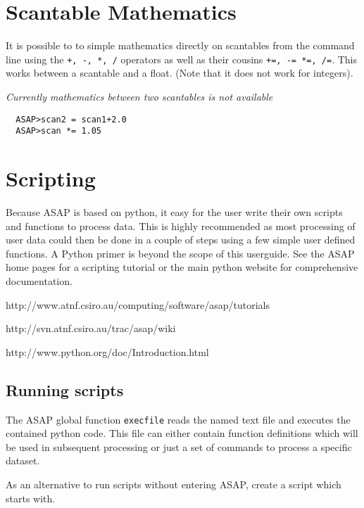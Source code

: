 \documentclass[11pt]{article}
\newcommand{\cmd}[1]{{\tt #1}}
\begin{document}
\section{Scantable Mathematics}

It is possible to to simple mathematics
directly on scantables from the command line using the \cmd{+, -, *,
/} operators as well as their cousins \cmd{+=, -= *=, /=}. This works
between a scantable and a float. (Note that it does
not work for integers).

{\em Currently mathematics between two scantables is not available }

\begin{verbatim}
  ASAP>scan2 = scan1+2.0
  ASAP>scan *= 1.05
\end{verbatim}

\section{Scripting}

Because ASAP is based on python, it easy for the user
write their own scripts and functions to process data. This is highly
recommended as most processing of user data could then be done in a
couple of steps using a few simple user defined functions. A Python
primer is beyond the scope of this userguide. See the ASAP home pages
for a scripting tutorial or the main python website for comprehensive
documentation.

\hspace{1cm} http://www.atnf.csiro.au/computing/software/asap/tutorials

\hspace{1cm} http://svn.atnf.csiro.au/trac/asap/wiki

\hspace{1cm} http://www.python.org/doc/Introduction.html

\subsection{Running scripts}

The ASAP global function \cmd{execfile} reads the named text file and
executes the contained python code. This file can either contain
function definitions which will be used in subsequent processing or
just a set of commands to process a specific dataset.

As an alternative to run scripts without entering ASAP, create a script which
starts with.
\end{document}
